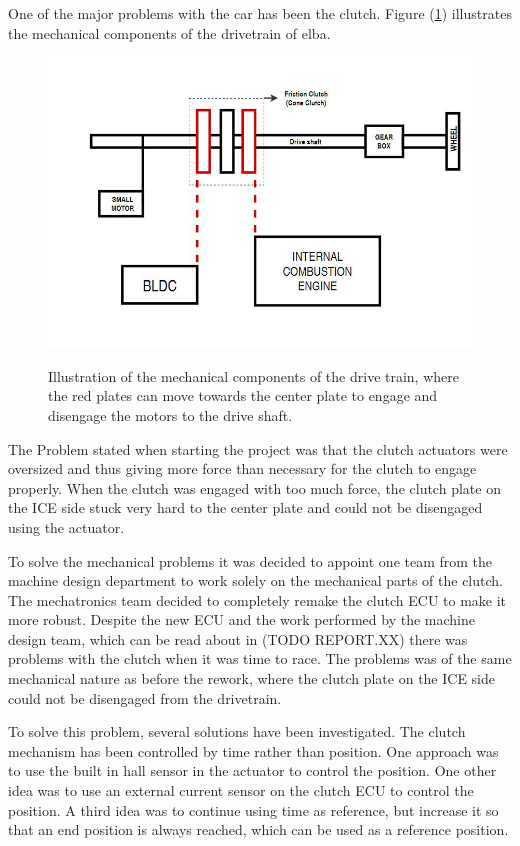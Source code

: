 One of the major problems with the car has been the clutch. Figure (\ref{fig:Drivetrain}) illustrates the mechanical components of the drivetrain of elba.

\begin{figure}[H]
    \centering\label{fig:Drivetrain}
    \includegraphics[width=1\textwidth]{./img/Drivetrain}
    \caption{Illustration of the mechanical components of the drive train, where the red plates can move towards the center plate to engage and disengage the motors to the drive shaft.}
\end{figure}

The Problem stated when starting the project was that the clutch actuators were
oversized and thus giving more force than necessary for the clutch to engage
properly. When the clutch was engaged with too much force, the clutch plate on
the ICE side stuck very hard to the center plate and could not be disengaged
using the actuator.

To solve the mechanical problems it was decided to appoint one team from the
machine design department to work solely on the mechanical parts of the clutch.
The mechatronics team decided to completely remake the clutch ECU to make it
more robust. Despite the new ECU and the work performed by the machine design
team, which can be read about in (TODO REPORT.XX) there was problems with the
clutch when it was time to race. The problems was of the same mechanical nature
as before the rework, where the clutch plate on the ICE side could not be
disengaged from the drivetrain.

To solve this problem, several solutions have been investigated. The clutch
mechanism has been controlled by time rather than position. One approach was to
use the built in hall sensor in the actuator to control the position. One other
idea was to use an external current sensor on the clutch ECU to control the
position. A third idea was to continue using time as reference, but increase it
so that an end position is always reached, which can be used as a reference
position.

